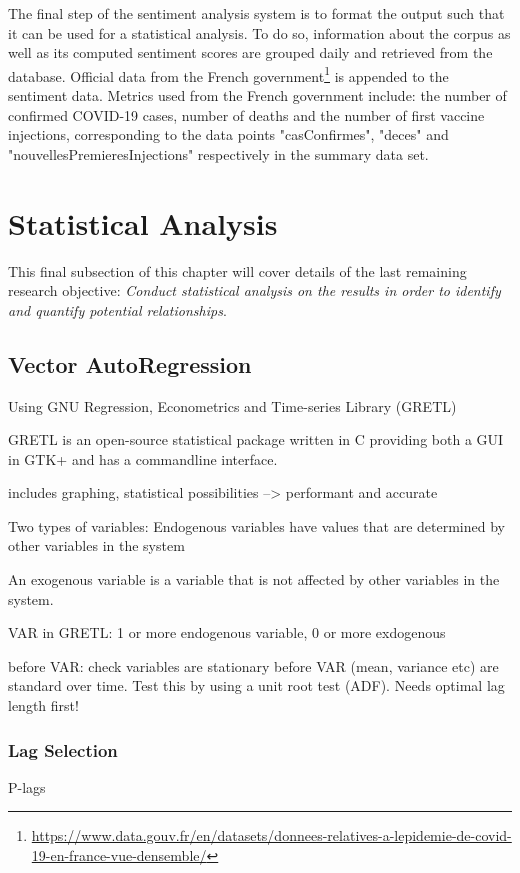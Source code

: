 The final step of the sentiment analysis system is to format the output such that it can be used for a statistical analysis. To do so, information about the corpus as well as its computed sentiment scores are grouped daily and retrieved from the database. Official data from the French government\footnote{\url{https://www.data.gouv.fr/en/datasets/donnees-relatives-a-lepidemie-de-covid-19-en-france-vue-densemble/}} is appended to the sentiment data. Metrics used from the French government include: the number of confirmed COVID-19 cases, number of deaths and the number of first vaccine injections, corresponding to the data points "casConfirmes", "deces" and "nouvellesPremieresInjections" respectively in the summary data set.

\section{Statistical Analysis}\label{chap: stat analysis}

This final subsection of this chapter will cover details of the last remaining research objective: \emph{Conduct statistical analysis on the results in order to identify and quantify potential relationships}.

\subsection{Vector AutoRegression}

Using GNU Regression, Econometrics and Time-series Library (GRETL)

GRETL is an open-source statistical
package written in C providing both a GUI in GTK+ and has a commandline interface. 

includes graphing, statistical possibilities
--> performant and accurate

Two types of variables:
Endogenous variables have values that are determined by other variables in the system

An exogenous variable is a variable that is not affected by other variables in the system.

VAR in GRETL: 1 or more endogenous variable, 0 or more exdogenous


before VAR: check variables are stationary before VAR (mean, variance etc) are standard over time. Test this by using a unit root test (ADF). Needs optimal lag length first!

\subsubsection{Lag Selection}

P-lags